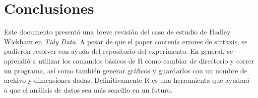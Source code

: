 \documentclass{llncs}
\begin{document}
\section{Conclusiones}
\label{sec:conc}

Este documento presentó una breve revisión del caso de estudio de Hadley Wickham en \textit{Tidy Data}.
A pesar de que el paper contenía errores de sintaxis, se pudieron resolver con ayuda del repositorio del experimento.
En general, se aprendió a utilizar los comandos básicos de R como cambiar de directorio y correr un programa,
así como también generar gráficos y guardarlos con un nombre de archivo y dimensiones dadas.
Definitivamente R es una herramienta que ayudará a que el análisis de datos sea más sencillo en un futuro.



\end{document}
